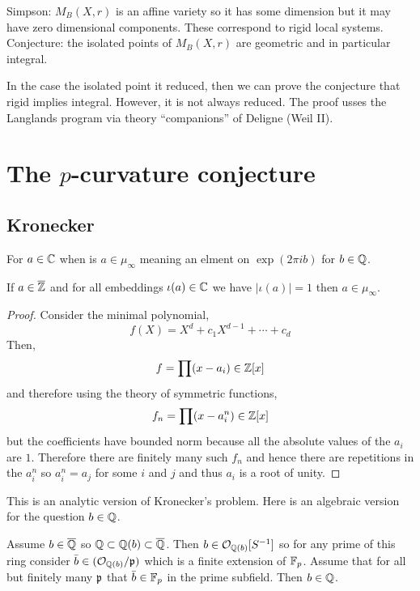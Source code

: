 \documentclass[12pt]{article}
\begin{document}
Simpson: $M_B(X, r)$ is an affine variety so it has some dimension but it may have zero dimensional components. These correspond to rigid local systems. Conjecture: the isolated points of $M_B(X, r)$ are geometric and in particular integral. 


In the case the isolated point it reduced, then we can prove the conjecture that rigid implies integral. However, it is not always reduced. The proof usses the Langlands program via theory ``companions'' of Deligne (Weil II). 


\section{The $p$-curvature conjecture}

\subsection{Kronecker}

For $a \in \mathbb{C}$ when is $a \in \mu_{\infty}$ meaning an elment on $\exp(2 \pi i b)$ for $b \in \mathbb{Q}$. 

\begin{prop}[Kronecker]
If $a \in \overline{\mathbb{Z}}$ and for all embeddings $\iota(a) \in \mathbb{C}$ we have $|\iota(a)| = 1$ then $a \in \mu_{\infty}$.
\end{prop}

\begin{proof}
Consider the minimal polynomial,
\[ f(X) = X^d + c_1 X^{d-1} + \cdots + c_d \]
Then,
\[ f = \prod (x - a_i) \in \mathbb{Z}[x] \]
and therefore using the theory of symmetric functions,
\[ f_n = \prod (x - a_i^n) \in \mathbb{Z}[x] \]
but the coefficients have bounded norm because all the absolute values of the $a_i$ are $1$. Therefore there are finitely many such $f_n$ and hence there are repetitions in the $a_i^n$ so $a_i^n = a_j$ for some $i$ and $j$ and thus $a_i$ is a root of unity. 
\end{proof}

\begin{rmk}
This is an analytic version of Kronecker's problem. Here is an algebraic version for the question $b \in \mathbb{Q}$. 
\end{rmk}

\begin{theorem}
Assume $b \in \overline{\mathbb{Q}}$ so $\mathbb{Q} \subset \mathbb{Q}(b) \subset \overline{\mathbb{Q}}$. Then $b \in \mathcal{O}_{\mathbb{Q}(b)}[S^{-1}]$ so for any prime of this ring consider $\bar{b} \in (\mathcal{O}_{\mathbb{Q}(b)} / \mathfrak{p})$ which is a finite extension of $\mathbb{F}_p$. Assume that for all but finitely many $\mathfrak{p}$ that $\bar{b} \in \mathbb{F}_p$ in the prime subfield. Then $b \in \mathbb{Q}$.
\end{theorem}
\end{document}
